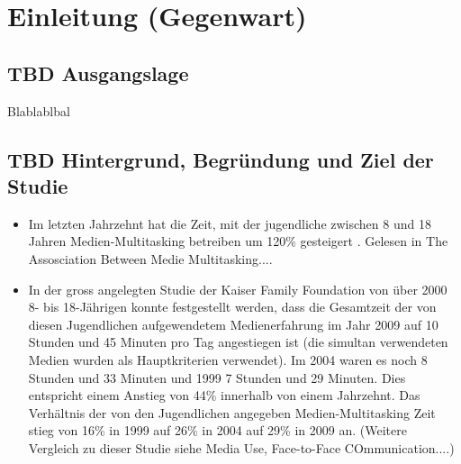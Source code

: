 %
%
\glsresetall %
\let\raggedsection\centering 
\chapter{Einleitung (Gegenwart)}\label{chap.einleitung}
\let\raggedsection\raggedright 

\section{TBD Ausgangslage}\label{section.ausgangslage}
Blablablbal

\section{TBD Hintergrund, Begründung und Ziel der Studie}\label{section.hintergrund}
\begin{itemize}
    \item Im letzten Jahrzehnt hat die Zeit, mit der jugendliche zwischen 8 und 18 Jahren Medien-Multitasking betreiben um 120\% gesteigert \cite{Rideout2010}. Gelesen in The Assosciation Between Medie Multitasking....
    \item In der gross angelegten Studie der Kaiser Family Foundation \cite{Rideout2010} von über 2000 8- bis 18-Jährigen konnte festgestellt werden, dass die Gesamtzeit der von diesen Jugendlichen aufgewendetem Medienerfahrung im Jahr 2009 auf 10 Stunden und 45 Minuten pro Tag angestiegen ist (die simultan verwendeten Medien wurden als Hauptkriterien verwendet). Im 2004 waren es noch 8 Stunden und 33 Minuten und 1999 7 Stunden und 29 Minuten. Dies entspricht einem Anstieg von 44\% innerhalb von einem Jahrzehnt. Das Verhältnis der von den Jugendlichen angegeben Medien-Multitasking Zeit stieg von 16\% in 1999 auf 26\% in 2004 auf 29\% in 2009 an. (Weitere Vergleich zu dieser Studie siehe Media Use, Face-to-Face COmmunication....)
\end{itemize}

